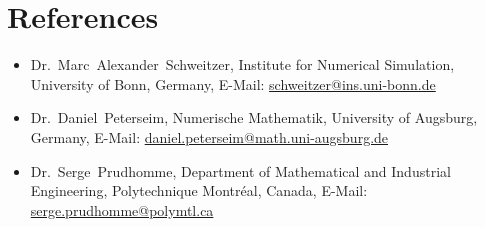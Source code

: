 \documentclass[11pt,a4paper,sans]{moderncv}
\begin{document}
\section{References}
\begin{itemize}[leftmargin=4cm]
\item Dr.~Marc~Alexander~Schweitzer, Institute for Numerical Simulation, University of Bonn, Germany, E-Mail: \url{schweitzer@ins.uni-bonn.de}
\item Dr.~Daniel~Peterseim, Numerische Mathematik, University of Augsburg, Germany, E-Mail: \url{daniel.peterseim@math.uni-augsburg.de}
\end{itemize}
\begin{itemize}[leftmargin=4cm]
\item Dr.~Serge~Prudhomme, Department of Mathematical and Industrial Engineering, Polytechnique Montr\'eal, Canada, E-Mail: \url{serge.prudhomme@polymtl.ca}
\end{itemize}
\end{document}
